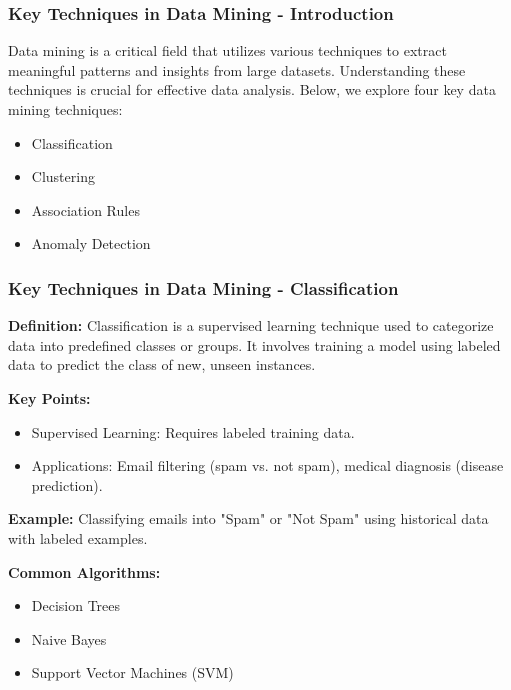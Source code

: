 \documentclass{beamer}
\begin{document}
\begin{frame}[fragile]
    \frametitle{Key Techniques in Data Mining - Introduction}
    Data mining is a critical field that utilizes various techniques to extract meaningful patterns and insights from large datasets. Understanding these techniques is crucial for effective data analysis. Below, we explore four key data mining techniques:
    \begin{itemize}
        \item Classification
        \item Clustering
        \item Association Rules
        \item Anomaly Detection
    \end{itemize}
\end{frame}

\begin{frame}[fragile]
    \frametitle{Key Techniques in Data Mining - Classification}
    \textbf{Definition:}   
    Classification is a supervised learning technique used to categorize data into predefined classes or groups. It involves training a model using labeled data to predict the class of new, unseen instances.

    \textbf{Key Points:}
    \begin{itemize}
        \item Supervised Learning: Requires labeled training data.
        \item Applications: Email filtering (spam vs. not spam), medical diagnosis (disease prediction).
    \end{itemize}

    \textbf{Example:}  
    Classifying emails into "Spam" or "Not Spam" using historical data with labeled examples.

    \textbf{Common Algorithms:}  
    \begin{itemize}
        \item Decision Trees
        \item Naive Bayes
        \item Support Vector Machines (SVM)
    \end{itemize}
\end{frame}
\end{document}
